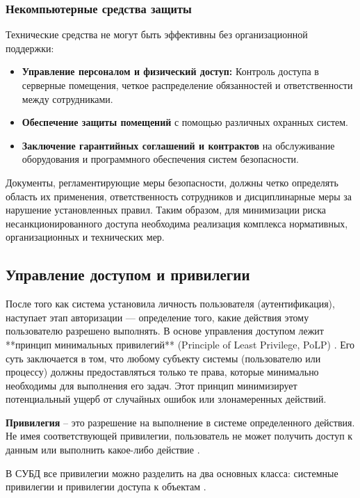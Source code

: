 \subsubsection{Некомпьютерные средства защиты}
Технические средства не могут быть эффективны без организационной поддержки:
\begin{itemize}
	\item \textbf{Управление персоналом и физический доступ:} Контроль доступа в серверные помещения, четкое распределение обязанностей и ответственности между сотрудниками.
	\item \textbf{Обеспечение защиты помещений} с помощью различных охранных систем.
	\item \textbf{Заключение гарантийных соглашений и контрактов} на обслуживание оборудования и программного обеспечения систем безопасности.
\end{itemize}
Документы, регламентирующие меры безопасности, должны четко определять область их применения, ответственность сотрудников и дисциплинарные меры за нарушение установленных правил. Таким образом, для минимизации риска несанкционированного доступа необходима реализация комплекса нормативных, организационных и технических мер.

\subsection{Управление доступом и привилегии}
После того как система установила личность пользователя (аутентификация), наступает этап авторизации — определение того, какие действия этому пользователю разрешено выполнять. В основе управления доступом лежит **принцип минимальных привилегий** (Principle of Least Privilege, PoLP) \autocite{oracledbdoc3}. Его суть заключается в том, что любому субъекту системы (пользователю или процессу) должны предоставляться только те права, которые минимально необходимы для выполнения его задач. Этот принцип минимизирует потенциальный ущерб от случайных ошибок или злонамеренных действий.

\begin{grayquote}
	\textbf{Привилегия} – это разрешение на выполнение в системе определенного действия. Не имея соответствующей привилегии, пользователь не может получить доступ к данным или выполнить какое-либо действие \autocite{Smirnov2007}.
\end{grayquote}

В СУБД все привилегии можно разделить на два основных класса: системные привилегии и привилегии доступа к объектам \autocite{MicrosoftLearnSQLserverPerm}.

